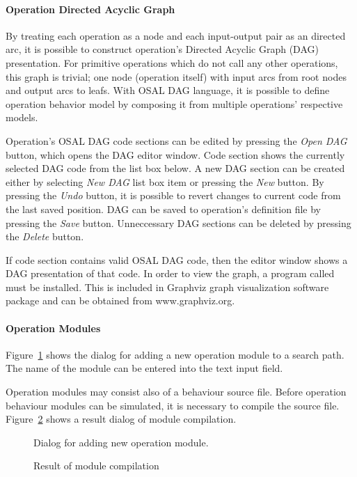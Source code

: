 \documentclass[a4paper,twoside]{tceusermanual}
\begin{document}
\paragraph{Operation Directed Acyclic Graph}

By treating each operation as a node and each input-output pair as an directed
arc, it is possible to construct operation's Directed Acyclic Graph (DAG)
presentation. For primitive operations which do not call any other operations,
this graph is trivial; one node (operation itself) with input arcs from root
nodes and output arcs to leafs. With OSAL DAG language, it is possible to
define operation behavior model by composing it from multiple operations'
respective models.

Operation's OSAL DAG code sections can be edited by pressing the \emph{Open DAG}
button, which opens the DAG editor window. Code section shows the currently
selected DAG code from the list box below. A new DAG section can be created
either by selecting \emph{New DAG} list box item or pressing the \emph{New} button.
By pressing the \emph{Undo} button, it is possible to revert changes to current
code from the last saved position. DAG can be saved to operation's definition
file by pressing the \emph{Save} button. Unneccessary DAG sections can be deleted
by pressing the \emph{Delete} button.

If code section contains valid OSAL DAG code, then the editor window shows
a DAG presentation of that code.  In order to view the graph, a
program called  must be installed. This is included in Graphviz graph
visualization software package and can be obtained from www.graphviz.org. 

\paragraph{Operation Modules}

Figure~\ref{fig:osed_add_module_dialog} shows the dialog for adding a new
operation module to a search path. The name of the module can be entered
into the text input field.  

Operation modules may consist also of a behaviour source file. Before
operation behaviour modules can be simulated, it is necessary to compile the
source file.  Figure~\ref{fig:osed_build_result_dialog} shows a result dialog of
module compilation. 

%
\begin{figure}[tb]
\centerline{}
\caption{Dialog for adding new operation module.}
\label{fig:osed_add_module_dialog}
\end{figure}
%
\begin{figure}[tb]
\centerline{}
\caption{Result of module compilation}
\label{fig:osed_build_result_dialog}
\end{figure}
\end{document}
